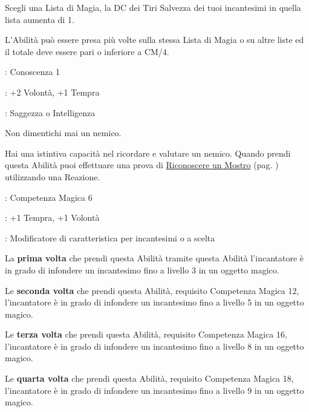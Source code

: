 \begin{multicols}{2}
Scegli una Lista di Magia, la DC dei Tiri Salvezza dei tuoi incantesimi in quella lista aumenta di 1.

L'Abilità può essere presa più volte sulla stessa Lista di Magia o su altre liste ed il totale deve essere pari o inferiore a CM/4.

\begin{description}[noitemsep, topsep=0pt, parsep=0pt, partopsep=0pt, leftmargin=0cm, labelwidth=2.5cm]
    \item[\textbf{Requisito}]: Conoscenza 1
    \item[\textbf{Tiri Salvezza}]: +2 Volontà, +1 Tempra
    \item[\textbf{Caratteristica}]: Saggezza o Intelligenza
\end{description}

Non dimentichi mai un nemico.

Hai una istintiva capacità nel ricordare e valutare un nemico. Quando prendi questa Abilità puoi effettuare una prova di \hyperlink{riconoscereimostri}{Riconoscere un Mostro} (pag. \pageref{riconoscereimostri}) utilizzando una Reazione.


\begin{description}[noitemsep, topsep=0pt, parsep=0pt, partopsep=0pt, leftmargin=0cm, labelwidth=2.5cm]
    \item[\textbf{Requisito}]: Competenza Magica 6
    \item[\textbf{Tiri Salvezza}]: +1 Tempra, +1 Volontà
    \item[\textbf{Caratteristica}]: Modificatore di caratteristica per incantesimi o a scelta
\end{description}

La \textbf{prima volta} che prendi questa Abilità tramite questa Abilità l'incantatore è in grado di infondere un incantesimo fino a livello 3 in un oggetto magico.

Le \textbf{seconda volta} che prendi questa Abilità, requisito Competenza Magica 12, l'incantatore è in grado di infondere un incantesimo fino a livello 5 in un oggetto magico.

Le \textbf{terza volta} che prendi questa Abilità, requisito Competenza Magica 16, l'incantatore è in grado di infondere un incantesimo fino a livello 8 in un oggetto magico.

Le \textbf{quarta volta} che prendi questa Abilità, requisito Competenza Magica 18, l'incantatore è in grado di infondere un incantesimo fino a livello 9 in un oggetto magico.



\end{multicols}
